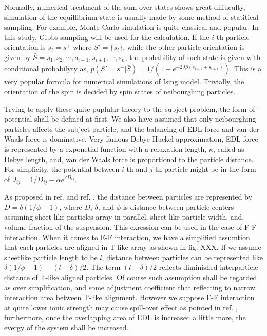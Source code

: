 \documentclass{article}
\begin{document}
Normally, numerical treatment of the sum over states shows great diffuculty, simulation of the equillibrium state is usually made by 
some method of statitical sampling. For example, Monte Carlo simulation is quite classical and popular. 
In this study, Gibbs sampling will be used for the calculation.
If the $i$ th particle orientation is $s_i = s^+$ where $S' = \{s_i\}$, while the other particle orientation is given by
 $\bar{S} = {s_1, s_2, \cdots, s_{i-1}, s_{i+1}, \cdots, s_n}$, the probability of such state is given with conditional probabilyty as,
$p(S'=s^+|\bar{S}) = 1 / (1 + e^{-2 J\beta (s_{i-1} + s_{i+1})})$\cite{Imada_Miyashita_stats_mech}. 
This is a very popular formula for numerical simulations of Ising model.
Trivially, the orientation of the spin is decided by spin states of neibourghing particles.

Trying to apply these quite puplular theory to the subject  problem, the form of potential shall be defined at first.
We also have assumed that only neibourghing particles affects the subject particle, and the balancing of EDL force and 
van der Waals force is dominative.
Very famous Debye-Huckel approximation, EDL force is represented by a exponetial function with a reluxation length, $\kappa$, 
called as Debye length, and, van der Waals force is proportional to the particle distance.
For simplicity, the potential between $i$ th and $j$ th particle
might be in the form of $J_{ij} = 1/D_{ij} - \alpha e^{\kappa D_{ij}}$.

As proposed in ref. \cite{adachi} and ref. \cite{sakairi}, the distance between particles are represented by $D = \delta (1/\phi - 1)$,
where $D$, $\delta$, and $\phi$ is distance between particle centers assuming sheet like particles array in parallel, sheet like particle width,
 and, volume fraction of the suspension. This exression can be used in the case of F-F interaction. 
When it comes to E-F interaction, we have a simplified assumtion that each particles are aligned in T-like array as shown in fig. XXX.
If we assume sheetlike particle length to be $l$, distance between particles can be represented like $\delta (1/\phi - 1) - (l-\delta)/2$.
The term $(l-\delta)/2$ reflects diminished interparticle distance of T-like aligned particles.
Of course such assumption shall be regarded as over simplification, and some adjustment coefficient that reflecting to narrow interaction area
between T-like alignment. However we suppose E-F interaction at quite lower ionic strength may cause spill-over effect as pointed in ref. \cite{sposito},
furthermore, once the overlapping area of EDL is increased a little more, the evergy of the system shall be increased.
\end{document}
